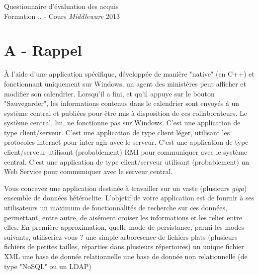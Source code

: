 \documentclass[a4paper,10pt]{article}
\begin{document}
\begin{center}
  \begin{Large}
    Questionnaire d'évaluation des acquis\\
    Formation .. - Cours \textit{Middleware} 2013
  \end{Large}
\end{center}

\section{A - Rappel}

\begin{question}{À l'aide d'une application spécifique, développée de manière "native" (en C++)
et fonctionnant uniquement sur Windows, un agent des ministères peut afficher et modifier son
calendrier. Lorsqu'il a fini, et qu'il appuye sur le bouton "Sauvegarder", les informations contenus
dans le calendrier sont envoyés à un système central et publiées pour être mis à disposition de ces
collaborateurs. Le système central, lui, ne fonctionne pas sur Windows.}
  \true C'est une application de type client/serveur.
  \false C'est une application de type client léger, utilisant les protocoles internet pour inter
  agir avec le serveur.
  \false C'est une application de type client/serveur utilisant (probablement) RMI pour communiquer
  avec le système central.
  \false C'est une application de type client/serveur utilisant (probablement) un Web Service pour
  communiquer avec le serveur central.
\end{question}

\begin{question}{Vous concevez une application destinée à travailler sur un vaste (plusieurs
\textit{giga}) ensemble de données hétéroclite. L'objetif de votre application est de fournir à ses
utilisateurs un maximum de fonctionnalités de recherche sur ces données, permettant, entre autre, de
aisément croiser les informations et les relier entre elles. En première approximation, quelle mode
de persistance, parmi les modes suivants, utiliseriez vous ?}
  \false une simple arboresence de fichiers plats (plusieurs fichiers de petites tailles, réparties
  dans plusieurs répertoires)
  \false un unique fichier XML
  \true une base de donnée relationnelle
  \true une base de donnée non relationnelle (de type "NoSQL" ou un LDAP)
\end{question}
\end{document}
